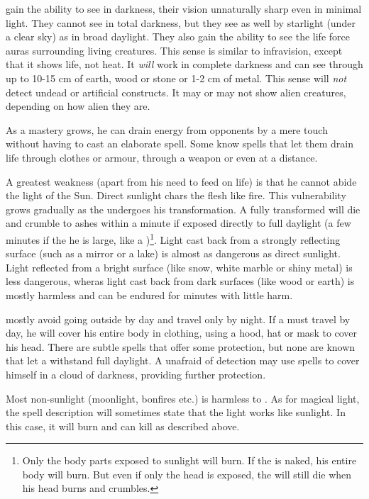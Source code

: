 \Reavers{} gain the ability to see in darkness, their vision unnaturally sharp even in minimal light. They cannot see in total darkness, but they see as well by starlight (under a clear sky) as in broad daylight. They also gain the ability to see the life force auras surrounding living creatures. This sense is similar to infravision, except that it shows life, not heat. It \emph{will} work in complete darkness and can see through up to 10-15 cm of earth, wood or stone or 1-2 cm of metal. This sense will \emph{not} detect undead or artificial constructs. It may or may not show alien creatures, depending on how alien they are. 

As a \Reaverz{} mastery grows, he can drain energy from opponents by a mere touch without having to cast an elaborate spell. Some \Reavers{} know spells that let them drain life through clothes or armour, through a weapon or even at a distance. 

A \Reaverz{} greatest weakness (apart from his need to feed on life) is that he cannot abide the light of the Sun. Direct sunlight chars the \Reaverz{} flesh like fire. This vulnerability grows gradually as the \Reaver{} undergoes his transformation. A fully transformed \Reaver{} will die and crumble to ashes within a minute if exposed directly to full daylight (a few minutes if the he is large, like a \dragon{})\footnote{Only the body parts exposed to sunlight will burn. If the \Reaver{} is naked, his entire body will burn. But even if only the head is exposed, the \Reaver{} will still die when his head burns and crumbles.}. Light cast back from a strongly reflecting surface (such as a mirror or a lake) is almost as dangerous as direct sunlight. Light reflected from a bright surface (like snow, white marble or shiny metal) is less dangerous, wheras light cast back from dark surfaces (like wood or earth) is mostly harmless and can be endured for minutes with little harm. 

\Reavers{} mostly avoid going outside by day and travel only by night. If a \Reaver{} must travel by day, he will cover his entire body in clothing, using a hood, hat or mask to cover his head. There are subtle spells that offer some protection, but none are known that let a \Reaver{} withstand full daylight. A \Reaver{} unafraid of detection may use spells to cover himself in a cloud of darkness, providing further protection. 

Most non-sunlight (moonlight, bonfires etc.) is harmless to \Reavers{}. As for magical light, the spell description will sometimes state that the light works like sunlight. In this case, it will burn and can kill \Reavers{} as described above. 

